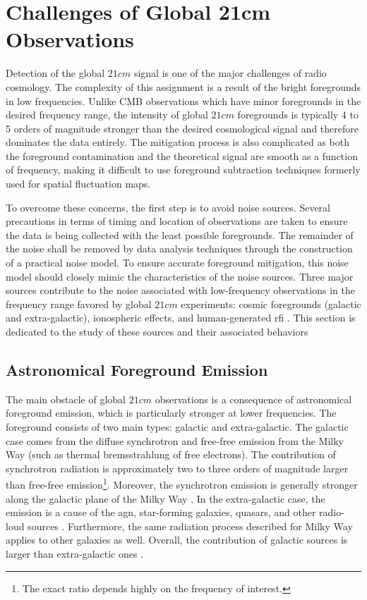 \documentclass[12pt, TexShade, letterpaper]{report}
\begin{document}
\section{Challenges of Global 21cm Observations}
Detection of the global $21cm$ signal is one of the major challenges of radio cosmology. The complexity of this assignment is a result of the bright foregrounds in low frequencies. Unlike CMB observations which have minor foregrounds in the desired frequency range, the intensity of global $21cm$ foregrounds is typically 4 to 5 orders of magnitude stronger than the desired cosmological signal and therefore dominates the data entirely. The mitigation process is also complicated as both the foreground contamination and the theoretical signal are smooth as a function of frequency, making it difficult to use foreground subtraction techniques formerly used for spatial fluctuation maps\cite{liu2013global, thesis_moso, thesis_shedding}.\par
To overcome these concerns, the first step is to avoid noise sources. Several precautions in terms of timing and location of observations are taken to ensure the data is being collected with the least possible foregrounds. The remainder of the noise shall be removed by data analysis techniques through the construction of a practical noise model. To ensure accurate foreground mitigation, this noise model should closely mimic the characteristics of the noise sources. Three major sources contribute to the noise associated with low-frequency observations in the frequency range favored by global $21cm$ experiments: cosmic foregrounds (galactic and extra-galactic), ionospheric effects, and human-generated \gls{rfi} \cite{thesis_pamela, thesis_shedding, book_21cm}. This section is dedicated to the study of these sources and their associated behaviors\par

\subsection{Astronomical Foreground Emission}
The main obstacle of global $21cm$ observations is a consequence of astronomical foreground emission, which is particularly stronger at lower frequencies. The foreground consists of two main types: galactic and extra-galactic. The galactic case comes from the diffuse synchrotron and free-free emission from the Milky Way (such as thermal bremsstrahlung of free electrons). The contribution of synchrotron radiation is approximately two to three orders of magnitude larger than free-free emission\footnote{The exact ratio depends highly on the frequency of interest.}. Moreover, the synchrotron emission is generally stronger along the galactic plane of the Milky Way \cite{thesis_shedding, thesis_pamela, pritchard_mcmc, reionization_old}.
In the extra-galactic case, the emission is a cause of the \gls{agn}, star-forming galaxies, quasars, and other radio-loud sources \cite{book_21cm}. Furthermore, the same radiation process described for Milky Way applies to other galaxies as well. Overall, the contribution of galactic sources is larger than extra-galactic ones \cite{pritchard_mcmc, reionization_old}.\par
\end{document}
